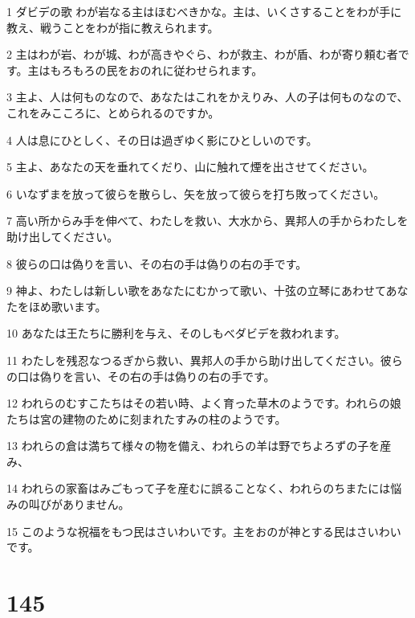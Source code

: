 \par 1 ダビデの歌 わが岩なる主はほむべきかな。主は、いくさすることをわが手に教え、戦うことをわが指に教えられます。
\par 2 主はわが岩、わが城、わが高きやぐら、わが救主、わが盾、わが寄り頼む者です。主はもろもろの民をおのれに従わせられます。
\par 3 主よ、人は何ものなので、あなたはこれをかえりみ、人の子は何ものなので、これをみこころに、とめられるのですか。
\par 4 人は息にひとしく、その日は過ぎゆく影にひとしいのです。
\par 5 主よ、あなたの天を垂れてくだり、山に触れて煙を出させてください。
\par 6 いなずまを放って彼らを散らし、矢を放って彼らを打ち敗ってください。
\par 7 高い所からみ手を伸べて、わたしを救い、大水から、異邦人の手からわたしを助け出してください。
\par 8 彼らの口は偽りを言い、その右の手は偽りの右の手です。
\par 9 神よ、わたしは新しい歌をあなたにむかって歌い、十弦の立琴にあわせてあなたをほめ歌います。
\par 10 あなたは王たちに勝利を与え、そのしもべダビデを救われます。
\par 11 わたしを残忍なつるぎから救い、異邦人の手から助け出してください。彼らの口は偽りを言い、その右の手は偽りの右の手です。
\par 12 われらのむすこたちはその若い時、よく育った草木のようです。われらの娘たちは宮の建物のために刻まれたすみの柱のようです。
\par 13 われらの倉は満ちて様々の物を備え、われらの羊は野でちよろずの子を産み、
\par 14 われらの家畜はみごもって子を産むに誤ることなく、われらのちまたには悩みの叫びがありません。
\par 15 このような祝福をもつ民はさいわいです。主をおのが神とする民はさいわいです。

\chapter{145}

